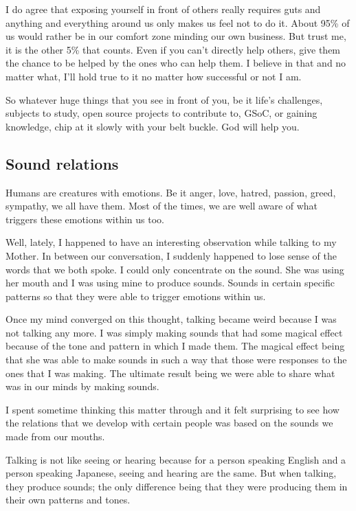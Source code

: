 \documentclass[twoside,11pt,titlepage]{article}
\begin{document}
I do agree that exposing yourself in front of others really requires guts and anything and everything around us only makes us feel not to do it. About 95\% of us would rather be in our comfort zone minding our own business. But trust me, it is the other 5\% that counts. Even if you can't directly help others, give them the chance to be helped by the ones who can help them. I believe in that and no matter what, I'll hold true to it no matter how successful or not I am.

So whatever huge things that you see in front of you, be it life's challenges, subjects to study, open source projects to contribute to, GSoC, or gaining knowledge, chip at it slowly with your belt buckle. God will help you.

\newpage
\begin{center}
  \section{Sound relations}
\end{center}
\bigskip
\bigskip
\bigskip

Humans are creatures with emotions. Be it anger, love, hatred, passion, greed, sympathy, we all have them. Most of the times, we are well aware of what triggers these emotions within us too.

Well, lately, I happened to have an interesting observation while talking to my Mother. In between our conversation, I suddenly happened to lose sense of the words that we both spoke. I could only concentrate on the sound. She was using her mouth and I was using mine to produce sounds. Sounds in certain specific patterns so that they were able to trigger emotions within us.

Once my mind converged on this thought, talking became weird because I was not talking any more. I was simply making sounds that had some magical effect because of the tone and pattern in which I made them. The magical effect being that she was able to make sounds in such a way that those were responses to the ones that I was making. The ultimate result being we were able to share what was in our minds by making sounds.

I spent sometime thinking this matter through and it felt surprising to see how the relations that we develop with certain people was based on the sounds we made from our mouths.

Talking is not like seeing or hearing because for a person speaking English and a person speaking Japanese, seeing and hearing are the same. But when talking, they produce sounds; the only difference being that they were producing them in their own patterns and tones.
\end{document}
